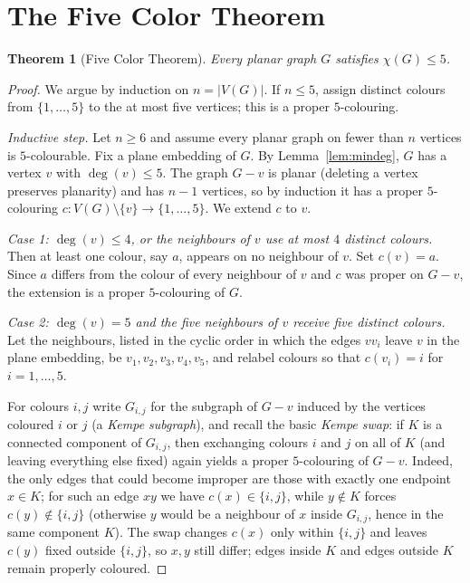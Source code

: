 \documentclass{amsart}
\newtheorem{theorem}{Theorem}
\theoremstyle{remark}
\begin{document}
\section{The Five Color Theorem}

\begin{theorem}[Five Color Theorem]\label{thm:five}
Every planar graph $G$ satisfies $\chi(G)\le 5$.
\end{theorem}

\begin{proof}
We argue by induction on $n=|V(G)|$. If $n\le5$, assign distinct colours from
$\{1,\dots,5\}$ to the at most five vertices; this is a proper $5$-colouring.

\emph{Inductive step.} Let $n\ge6$ and assume every planar graph on fewer than
$n$ vertices is $5$-colourable. Fix a plane embedding of $G$. By
Lemma~\ref{lem:mindeg}, $G$ has a vertex $v$ with $\deg(v)\le5$. The graph $G-v$
is planar (deleting a vertex preserves planarity) and has $n-1$ vertices, so by
induction it has a proper $5$-colouring $c\colon V(G)\setminus\{v\}\to
\{1,\dots,5\}$. We extend $c$ to $v$.

\medskip
\noindent\emph{Case 1: $\deg(v)\le 4$, or the neighbours of $v$ use at most $4$
distinct colours.} Then at least one colour, say $a$, appears on no neighbour of
$v$. Set $c(v)=a$. Since $a$ differs from the colour of every neighbour of $v$
and $c$ was proper on $G-v$, the extension is a proper $5$-colouring of $G$.

\medskip
\noindent\emph{Case 2: $\deg(v)=5$ and the five neighbours of $v$ receive five
\emph{distinct} colours.} Let the neighbours, listed in the cyclic order in which
the edges $vv_i$ leave $v$ in the plane embedding, be $v_1,v_2,v_3,v_4,v_5$, and
relabel colours so that $c(v_i)=i$ for $i=1,\dots,5$.

For colours $i,j$ write $G_{i,j}$ for the subgraph of $G-v$ induced by the
vertices coloured $i$ or $j$ (a \emph{Kempe subgraph}), and recall the basic
\emph{Kempe swap}: if $K$ is a connected component of $G_{i,j}$, then exchanging
colours $i$ and $j$ on all of $K$ (and leaving everything else fixed) again
yields a proper $5$-colouring of $G-v$. Indeed, the only edges that could become
improper are those with exactly one endpoint $x\in K$; for such an edge $xy$ we
have $c(x)\in\{i,j\}$, while $y\notin K$ forces $c(y)\notin\{i,j\}$ (otherwise $y$
would be a neighbour of $x$ inside $G_{i,j}$, hence in the same component $K$).
The swap changes $c(x)$ only within $\{i,j\}$ and leaves $c(y)$ fixed outside
$\{i,j\}$, so $x,y$ still differ; edges inside $K$ and edges outside $K$ remain
properly coloured.


\end{proof}
\end{document}
